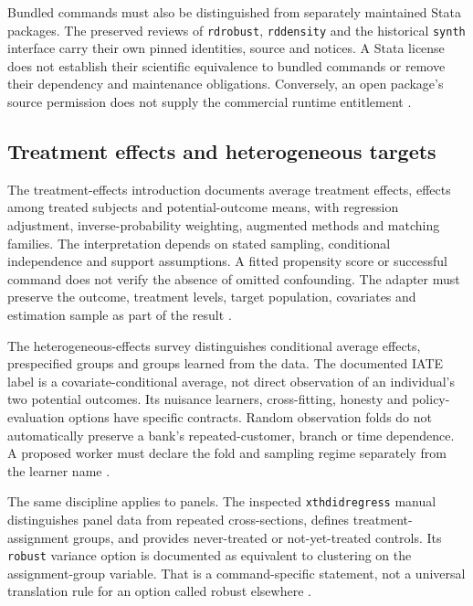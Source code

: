 Bundled commands must also be distinguished from separately maintained
Stata packages. The preserved reviews of \texttt{rdrobust},
\texttt{rddensity} and the historical \texttt{synth} interface carry their
own pinned identities, source and notices. A Stata license does not
establish their scientific equivalence to bundled commands or remove their
dependency and maintenance obligations. Conversely, an open package's
source permission does not supply the commercial runtime entitlement
\citep{exec13_ivrd_rdrobust,exec13_ivrd_rddensity,exec19_synth_stata_source,
exec24_stata_choice}.

\subsection{Treatment effects and heterogeneous targets}
The treatment-effects introduction documents average treatment effects,
effects among treated subjects and potential-outcome means, with regression
adjustment, inverse-probability weighting, augmented methods and matching
families. The interpretation depends on stated sampling, conditional
independence and support assumptions. A fitted propensity score or
successful command does not verify the absence of omitted confounding.
The adapter must preserve the outcome, treatment levels, target population,
covariates and estimation sample as part of the result
\citep{exec13_ci_stata_causal_intro}.

The heterogeneous-effects survey distinguishes conditional average effects,
prespecified groups and groups learned from the data. The documented IATE
label is a covariate-conditional average, not direct observation of an
individual's two potential outcomes. Its nuisance learners, cross-fitting,
honesty and policy-evaluation options have specific contracts. Random
observation folds do not automatically preserve a bank's repeated-customer,
branch or time dependence. A proposed worker must declare the fold and
sampling regime separately from the learner name
\citep{exec13_ch_stata,exec24_stata_choice}.

The same discipline applies to panels. The inspected
\texttt{xthdidregress} manual distinguishes panel data from repeated
cross-sections, defines treatment-assignment groups, and provides
never-treated or not-yet-treated controls. Its \texttt{robust} variance
option is documented as equivalent to clustering on the assignment-group
variable. That is a command-specific statement, not a universal translation
rule for an option called robust elsewhere
\citep{exec18_gp_stata_xthdid}.

